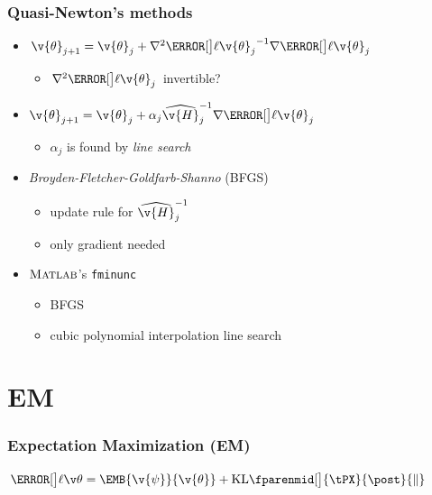 \documentclass[t,professionalfont,10pt]{beamer}
\newcommand{\matlab}{\textsc{Matlab}}
\newcommand{\Th}{\v{\theta}}
\newcommand{\KL}[2]{\mathrm{KL}\fparenmid[\big]{#1}{#2}{\Vert}}
\begin{document}
\begin{frame}
	\frametitle{Quasi-Newton's methods}
	\begin{itemize}
	  \item $\Th_{j+1} = \Th_j+\nabla^2\lLH[\Th_j]^{-1}\nabla\lLH[\Th_j]$
	  \begin{itemize}
	  	\item $\nabla^2\lLH[\Th_j]$ invertible?   
	  \end{itemize}
	  \item $\Th_{j+1} = \Th_j+\alpha_j\widehat{\v{H}}^{-1}_{j}\nabla\lLH[\Th_j]$
	  \begin{itemize}
	  	\item $\alpha_j$ is found by \emph{line search}
	  \end{itemize}
	  \item \emph{Broyden-Fletcher-Goldfarb-Shanno} (BFGS)
	  \begin{itemize}
	  	\item update rule for $\widehat{\v{H}}^{-1}_{j}$  
	  	\item only gradient needed
	  \end{itemize}
	  \item $\matlab$'s \texttt{fminunc}
	  \begin{itemize}
	  	\item BFGS
	  	\item cubic polynomial interpolation line search  
	  \end{itemize}
	\end{itemize}
\end{frame}

\section{EM}

\begin{frame}[plain]
\frametitle{Expectation Maximization (EM)}\vspace{-0.5cm}
$\lLH = \EMB{\v{\psi}}{\Th}+\KL{\tPX}{\post}$\\[0.4cm]
\end{frame}
\end{document}
